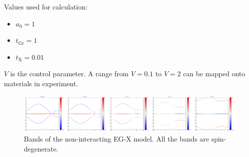 \documentclass[../notes.tex]{subfiles}
\begin{document}
Values used for calculation:
\begin{itemize}
	\item \(a_0 = 1\)
	\item \(t_{\mathrm{Gr}} = 1\)
	\item \(t_{\mathrm{X}} = 0.01\)
\end{itemize}
\(V\) is the control parameter.
A range from \(V=0.1\) to \(V=2\) can be mapped onto materials in experiment.

\begin{figure}[t]
	\centering
	\includegraphics[width=\textwidth]{images/EG_X bands_tGr_1_tX_0.01}
	\caption{Bands of the non-interacting EG-X model. All the bands are spin-degenerate.}
	\label{fig:EG-X model non-interacting bands}
\end{figure}
\end{document}
